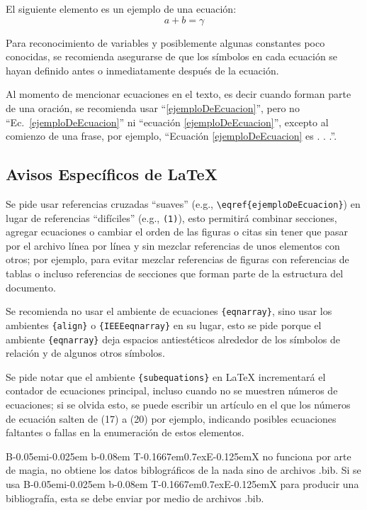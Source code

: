 \documentclass[letterpaper, 10pt, conference]{IEEEtran} %
\def \BibTeX{
	{\rm B\kern-0.05em{\sc i\kern-0.025em b}\kern-0.08em
	T\kern-0.1667em\lower0.7ex\hbox{E}\kern-0.125emX}
}
\begin{document}
	El siguiente elemento es un ejemplo de una ecuación:
	\begin{equation}
		a + b = \gamma
		\label{ejemploDeEcuacion}
	\end{equation}
	
	Para reconocimiento de variables y posiblemente algunas constantes poco conocidas, se recomienda asegurarse de que los símbolos en cada ecuación se hayan definido antes o inmediatamente después de la ecuación.
	
	Al momento de mencionar ecuaciones en el texto, es decir cuando forman parte de una oración, se recomienda usar ``\eqref{ejemploDeEcuacion}'', pero no ``Ec.~\eqref{ejemploDeEcuacion}'' ni ``ecuación \eqref{ejemploDeEcuacion}'', excepto al comienzo de una frase, por ejemplo, ``Ecuación \eqref{ejemploDeEcuacion} es . . .''.
	
	\subsection{Avisos Específicos de {\LaTeX}} \label{subseccionAvisosEspecificosDeLatex}
	Se pide usar referencias cruzadas ``suaves'' (e.g., \verb|\eqref{ejemploDeEcuacion}|) en lugar de referencias ``difíciles'' (e.g., \verb|(1)|), esto permitirá combinar secciones, agregar ecuaciones o cambiar el orden de las figuras o citas sin tener que pasar por el archivo línea por línea y sin mezclar referencias de unos elementos con otros; por ejemplo, para evitar mezclar referencias de figuras con referencias de tablas o incluso referencias de secciones que forman parte de la estructura del documento.
	
	Se recomienda no usar el ambiente de ecuaciones \verb|{eqnarray}|, sino usar los ambientes \verb|{align}| o \verb|{IEEEeqnarray}| en su lugar, esto se pide porque el ambiente \verb|{eqnarray}| deja espacios antiestéticos alrededor de los símbolos de relación y de algunos otros símbolos.
	
	Se pide notar que el ambiente \verb|{subequations}| en {\LaTeX} incrementará el contador de ecuaciones principal, incluso cuando no se muestren números de ecuaciones; si se olvida esto, se puede escribir un artículo en el que los números de ecuación salten de (17) a (20) por ejemplo, indicando posibles ecuaciones faltantes o fallas en la enumeración de estos elementos.
	
	{\BibTeX} no funciona por arte de magia, no obtiene los datos biblográficos de la nada sino de archivos .bib. Si se usa {\BibTeX} para producir una bibliografía, esta se debe enviar por medio de archivos .bib.
	
\end{document}
